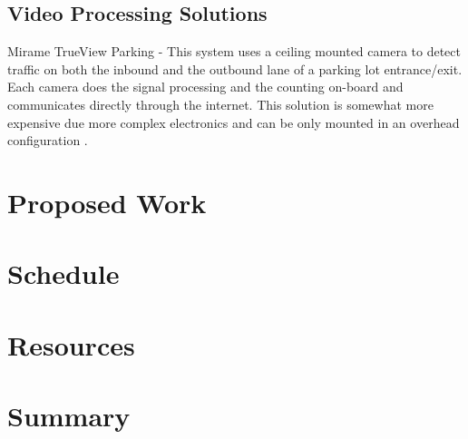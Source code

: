 \documentclass[letterpaper,10 pt,conference,onecolumn]{IEEEtran}
\begin{document}
		\subsection{Video Processing Solutions}
			Mirame TrueView Parking - This system uses a ceiling mounted camera to detect traffic on both the inbound and the outbound lane of a parking lot entrance/exit. Each camera does the signal processing and the counting on-board and communicates directly through the internet. This solution is somewhat more expensive due more complex electronics and can be only mounted in an overhead configuration \cite{trueview}.
	
	\section{Proposed Work}
		
		
	\section{Schedule}
		
		
	\section{Resources}
		
		
	\section{Summary}
 		
		
	\begin{multicols}{2}
	
	
	\end{multicols}
	
\end{document}

